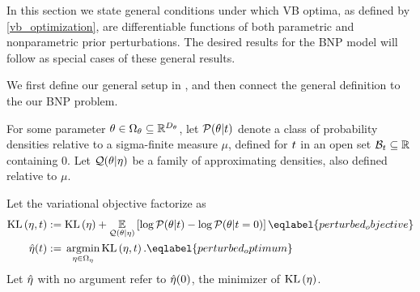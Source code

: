 In this section we state general conditions under which VB optima, as defined by
\eqref{vb_optimization}, are differentiable functions of both parametric and
nonparametric prior perturbations.  The desired results for the BNP model will
follow as special cases of these general results.

We first define our general setup in , and then connect
the general definition to the our BNP problem.

\begin{defn}
%
For some parameter $\theta \in \Omega_{\theta} \subseteq \mathbb{R}^{{D_{\theta}}}$, let
$\mathcal{P}(\theta \vert t)$ denote a class of probability densities relative to
a sigma-finite measure $\mu$, defined for $t$ in an open set $\mathcal{B}_t
\subseteq \mathbb{R}$ containing $0$.  Let $\mathcal{Q}(\theta \vert \eta)$ be a
family of approximating densities, also defined relative to $\mu$.

Let the variational objective factorize as
%
\begin{align}
%
\KL{\eta, \t} :={}&
    \KL{\eta} +
    \expect{\q(\theta \vert \eta)}
       {\log \p(\theta \vert \t) - \log \p(\theta \vert \t=0)}           \eqlabel{perturbed_objective}\\
\etaopt(\t) :={}& \argmin_{\eta \in \etadom} \KL{\eta, \t}.
    \eqlabel{perturbed_optimum}
%
\end{align}
%
Let $\hat\eta$ with no argument refer to $\hat\eta(0)$, the minimizer
of $\mathrm{KL}\left(\eta\right)$.
%
\end{defn}

